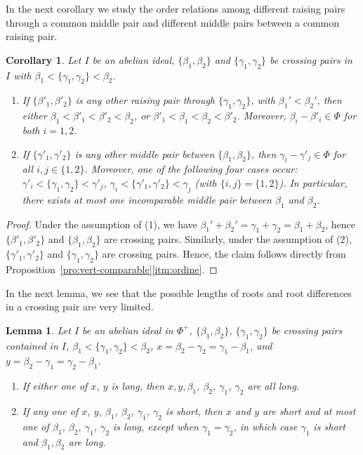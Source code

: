 \documentclass[10pt]{amsart}
\newtheorem{lem}[thm]{Lemma}
\newtheorem{cor}[thm]{Corollary}
\theoremstyle{definition}
\theoremstyle{remark}
\newcommand\be{\beta}
\newcommand\ga{\gamma}
\begin{document}
In the next corollary we study the order relations among different raising pairs through a common middle pair and  different middle pairs between a common raising pair. 

\begin{cor}\label{cor:catene-crossing}
Let $I$ be an abelian ideal, $\{\be_1, \be_2\}$ and $\{\ga_1, \ga_2\}$ be crossing pairs in $I$ with $\be_1< \{\ga_1, \ga_2\}< \be_2$. 
\begin{enumerate}
\item
If $\{\be'_1, \be'_2\}$ is any other raising pair through $\{\ga_1, \ga_2\}$, with $\be_1'<\be_2'$, then either $\be_1< \be'_1< \be'_2< \be_2$, or $\be'_1< \be_1< \be_2< \be'_2$. Moreover,  $\be_i-\be'_i\in \Phi$ for both $i=1, 2$.
\item
If $\{\ga'_1, \ga'_2\}$ is any other middle pair between $\{\be_1, \be_2\}$, then
$\ga_i-\ga'_j\in \Phi$ for all $i,j\in \{1, 2\}$. 
Moreover, one of the following four cases occur: $\ga'_i< \{\ga_1, \ga_2\}< \ga'_j$, $ \ga_i< \{\ga'_1, \ga'_2\}< \ga_j$ (with $\{i, j\}=\{1, 2\}$). 
In particular, there exists at most one incomparable middle pair between 
$\be_1$ and $\be_2$.
\end{enumerate}
\end{cor}

\begin{proof}
Under the assumption of (1), we have $\be_1'+\be_2'=\ga_1+\ga_2=\be_1+\be_2$, hence $\{\be'_1, \be'_2\}$ and $\{\be_1, \be_2\}$ are crossing pairs. 
Similarly, under the assumption of (2),  $\{\ga'_1, \ga'_2\}$ and $\{\ga_1, \ga_2\}$ are crossing pairs. Hence, the claim  follows directly from Proposition~\ref{pro:vert-comparable}\ref{itm:ordine}.  
\end{proof}

In the next lemma, we see that the possible lengths of roots and root differences in a crossing pair are very limited.

\begin{lem}\label{lem:lunghezze-radici-crossing}
Let $I$ be an abelian ideal in $\Phi^+$, $\{\be_1, \be_2\}$,  $\{\ga_1, \ga_2\}$ be crossing pairs contained in $I$, $\be_1 < \{\ga_1,\ga_2\} < \be_2$, 
$x=\be_2-\ga_2=\ga_1-\be_1$, and $y=\be_2-\ga_1=\ga_2-\be_1$.  
\begin{enumerate}
\item\label{itm:xy}
If either one of $x$, $y$ is long, then $x,y, \be_1$, $\be_2$, $\ga_1$, $\ga_2$ are all long. 
\item\label{itm:tutti}
If any one of $x$, $y$, $\be_1$, $\be_2$, $\ga_1$, $\ga_2$ is short,  then $x$ and $y$ are short and at most one of $\be_1$, $\be_2$, $\ga_1$, $\ga_2$ is long, except when $\ga_1=\ga_2$, in which case $\ga_1$ is short and $\be_1, \be_2$ are long. 
\end{enumerate}
\end{lem}
\end{document}

